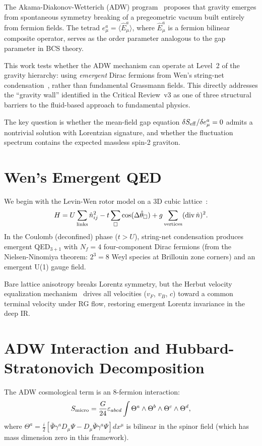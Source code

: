 \documentclass[aps,prd,twocolumn,superscriptaddress,nofootinbib]{revtex4-2}
\begin{document}
The Akama-Diakonov-Wetterich (ADW) program~\cite{Akama1978,Diakonov2011,Wetterich2005}
proposes that gravity emerges from spontaneous symmetry breaking of a
pregeometric vacuum built entirely from fermion fields. The tetrad
$e^a_\mu = \langle \hat{E}^a_\mu \rangle$, where $\hat{E}^a_\mu$ is a
fermion bilinear composite operator, serves as the order parameter
analogous to the gap parameter in BCS theory.

This work tests whether the ADW mechanism can operate at Level~2 of the
gravity hierarchy: using \emph{emergent} Dirac fermions from Wen's
string-net condensation~\cite{Wen2006}, rather than fundamental Grassmann
fields. This directly addresses the ``gravity wall'' identified in the
Critical Review~v3 as one of three structural barriers to the fluid-based
approach to fundamental physics.

The key question is whether the mean-field gap equation
$\delta S_{\rm eff}/\delta e^a_\mu = 0$
admits a nontrivial solution with Lorentzian signature, and whether the
fluctuation spectrum contains the expected massless spin-2 graviton.

\section{Wen's Emergent QED}

We begin with the Levin-Wen rotor model on a 3D cubic lattice~\cite{Wen2006}:
\begin{equation}
H = U \sum_{\rm links} \hat{n}_{ij}^2
    - t \sum_\square \cos(\Delta \hat{\theta}_\square)
    + g \sum_{\rm vertices} ({\rm div}\, \hat{n})^2.
\end{equation}
In the Coulomb (deconfined) phase ($t > U$), string-net condensation
produces emergent QED$_{3+1}$ with $N_f = 4$ four-component Dirac fermions
(from the Nielsen-Ninomiya theorem: $2^3 = 8$ Weyl species at Brillouin
zone corners) and an emergent U(1) gauge field.

Bare lattice anisotropy breaks Lorentz symmetry, but the Herbut velocity
equalization mechanism~\cite{Roy2016} drives all velocities ($v_F$, $v_B$,
$c$) toward a common terminal velocity under RG flow, restoring emergent
Lorentz invariance in the deep IR.

\section{ADW Interaction and Hubbard-Stratonovich Decomposition}

The ADW cosmological term is an 8-fermion interaction:
\begin{equation}
S_{\rm micro} = \frac{G}{24} \varepsilon_{abcd}
  \int \Theta^a \wedge \Theta^b \wedge \Theta^c \wedge \Theta^d,
\end{equation}
where $\Theta^a = \frac{i}{2}[\bar\Psi \gamma^a D_\mu \Psi
- D_\mu \bar\Psi \gamma^a \Psi] dx^\mu$ is bilinear in the spinor field
(which has mass dimension zero in this framework).
\end{document}
